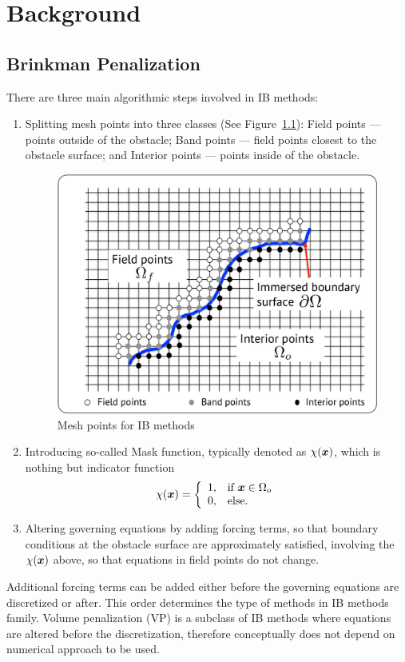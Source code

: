 \chapter{Background}
\label{chapter:2}
\section{Brinkman Penalization}
There are three main algorithmic steps involved in IB methods:
\begin{enumerate}
\item
Splitting mesh points into three classes (See Figure~\ref{fig:ib_mesh}): Field points --- points outside of the obstacle; Band points --- field points closest to the obstacle surface; and Interior points --- points inside of the obstacle.
\begin{figure}[h!]
\centering \includegraphics[scale=0.5]{fig/ib.pdf}
\caption{Mesh points for IB methods} \label{fig:ib_mesh}
\end{figure}
\item
Introducing so-called Mask function, typically denoted as $\chi(\boldsymbol{x})$, which is nothing but indicator function
\begin{align*}
\chi(\boldsymbol{x}) = \left\{\begin{array}{cl}
1, & \textmd{if } \boldsymbol{x} \in \Omega_o \\
0, & \textmd{else.}
\end{array}\right.
\end{align*}
\item
Altering governing equations by adding forcing terms, so that boundary conditions at the obstacle surface are approximately satisfied, involving the $\chi(\boldsymbol{x})$ above, so that equations in field points do not change.
\end{enumerate}
Additional forcing terms can be added either before the governing equations are discretized or after. This order determines the type of methods in IB methods family. Volume penalization (VP) is a subclass of IB methods where equations are altered before the discretization, therefore conceptually does not depend on numerical approach to be used.

